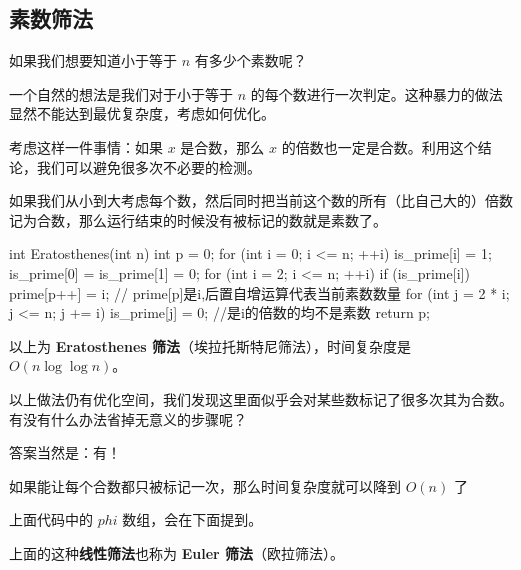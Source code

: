 
\subsection{素数筛法}

如果我们想要知道小于等于 $n$ 有多少个素数呢？

一个自然的想法是我们对于小于等于 $n$ 的每个数进行一次判定。这种暴力的做法显然不能达到最优复杂度，考虑如何优化。

考虑这样一件事情：如果 $x$ 是合数，那么 $x$ 的倍数也一定是合数。利用这个结论，我们可以避免很多次不必要的检测。

如果我们从小到大考虑每个数，然后同时把当前这个数的所有（比自己大的）倍数记为合数，那么运行结束的时候没有被标记的数就是素数了。

\begin{cppcode}
int Eratosthenes(int n) {
  int p = 0;
  for (int i = 0; i <= n; ++i) is_prime[i] = 1;
  is_prime[0] = is_prime[1] = 0;
  for (int i = 2; i <= n; ++i) {
    if (is_prime[i]) {
      prime[p++] = i;  // prime[p]是i,后置自增运算代表当前素数数量
      for (int j = 2 * i; j <= n; j += i)
        is_prime[j] = 0;  //是i的倍数的均不是素数
    }
  }
  return p;
}
\end{cppcode}

以上为 \textbf{Eratosthenes 筛法}（埃拉托斯特尼筛法），时间复杂度是 $O(n\log\log n)$。

以上做法仍有优化空间，我们发现这里面似乎会对某些数标记了很多次其为合数。有没有什么办法省掉无意义的步骤呢？

答案当然是：有！

如果能让每个合数都只被标记一次，那么时间复杂度就可以降到 $O(n)$ 了


上面代码中的 $phi$ 数组，会在下面提到。

上面的这种\textbf{线性筛法}也称为 \textbf{Euler 筛法}（欧拉筛法）。

